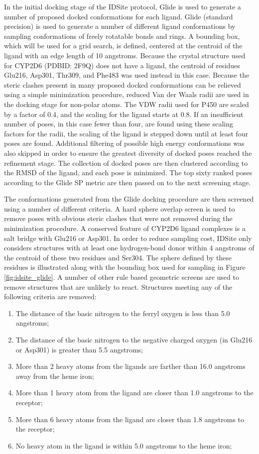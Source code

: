 In the initial docking stage of the IDSite protocol, Glide is used to generate a number of proposed docked conformations for each ligand.
Glide (standard precision) is used to generate a number of different ligand conformations by sampling conformations of freely rotatable bonds and rings.
A bounding box, which will be used for a grid search, is defined, centered at the centroid of the ligand with an edge length of 10 angstroms.
Because the crystal structure used for CYP2D6 (PDBID: 2F9Q) does not have a ligand, the centroid of residues Glu216, Asp301, Thr309, and Phe483 was used instead in this case.
Because the steric clashes present in many proposed docked conformations can be relieved using a simple minimization procedure, reduced Van der Waals radii are used in the docking stage for non-polar atoms.
The VDW radii used for P450 are scaled by a factor of 0.4, and the scaling for the ligand starts at 0.8.
If an insufficient number of poses, in this case fewer than four, are found using these scaling factors for the radii, the scaling of the ligand is stepped down until at least four poses are found.
Additional filtering of possible high energy conformations was also skipped in order to ensure the greatest diversity of docked poses reached the refinement stage.
The collection of docked poses are then clustered according to the RMSD of the ligand, and each pose is minimized.
The top sixty ranked poses according to the Glide SP metric are then passed on to the next screening stage.

The conformations generated from the Glide docking procedure are then screened using a number of different criteria.
A hard sphere overlap screen is used to remove poses with obvious steric clashes that were not removed during the minimization procedure.
A conserved feature of CYP2D6 ligand complexes is a salt bridge with Glu216 or Asp301.
In order to reduce sampling cost, IDSite only considers structures with at least one hydrogen-bond donor within 4 angstroms of the centroid of these two residues and Ser304.
The sphere defined by these residues is illustrated along with the bounding box used for sampling in Figure \ref{fig:idsite_glide}.
A number of other rule based geometric screens are used to remove structures that are unlikely to react.
Structures meeting any of the following criteria are removed:
\begin{enumerate}
\item The distance of the basic nitrogen to the ferryl oxygen is less than 5.0 angstroms;
\item The distance of the basic nitrogen to the negative charged oxygen (in Glu216 or Asp301) is greater than 5.5 angstroms;
\item More than 2 heavy atoms from the ligands are farther than 16.0 angstroms away from the heme iron;
\item More than 1 heavy atom from the ligand are closer than 1.0 angstroms to the receptor;
\item More than 6 heavy atoms from the ligand are closer than 1.8 angstroms to the receptor;
\item No heavy atom in the ligand is within 5.0 angstroms to the heme iron;
\end{enumerate}

